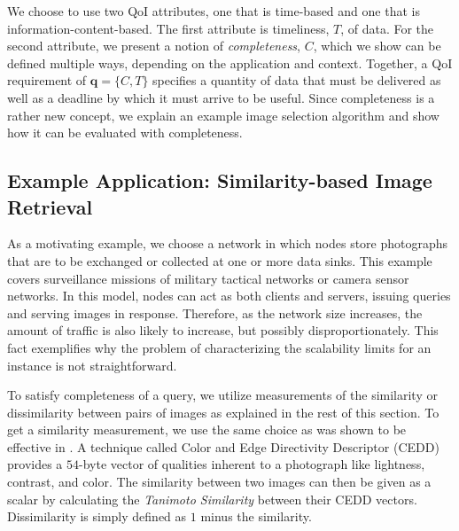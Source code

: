 We choose to use two QoI attributes, one that is time-based and one that is information-content-based.  The first attribute is timeliness, $T$, of data.  For the second attribute, we present a notion of \emph{completeness}, $C$, which we show can be defined multiple ways, depending on the application and context.  Together, a QoI requirement of $\mathbf{q} = \{C,T\}$ specifies a quantity of data that must be delivered as well as a deadline by which it must arrive to be useful.  Since completeness is a rather new concept, we explain an example image selection algorithm and show how it can be evaluated with completeness.

\subsection{Example Application: Similarity-based Image Retrieval}

As a motivating example, we choose a network in which nodes store photographs that are to be exchanged or collected at one or more data sinks.  This example covers surveillance missions of military tactical networks or camera sensor networks.  In this model, nodes can act as both clients and servers, issuing queries and serving images in response.  Therefore, as the network size increases, the amount of traffic is also likely to increase, but possibly disproportionately.  This fact exemplifies why the problem of characterizing the scalability limits for an instance is not straightforward.

To satisfy completeness of a query, we utilize measurements of the similarity or dissimilarity between pairs of images as explained in the rest of this section.  To get a similarity measurement, we use the same choice as was shown to be effective in \cite{mediascope}.  A technique called Color and Edge Directivity Descriptor (CEDD) \cite{2008cedd} provides a $54$-byte vector of qualities inherent to a photograph like lightness, contrast, and color.  The similarity between two images can then be given as a scalar by calculating the \emph{Tanimoto Similarity} \cite{tanimoto} between their CEDD vectors.  Dissimilarity is simply defined as $1$ minus the similarity.

